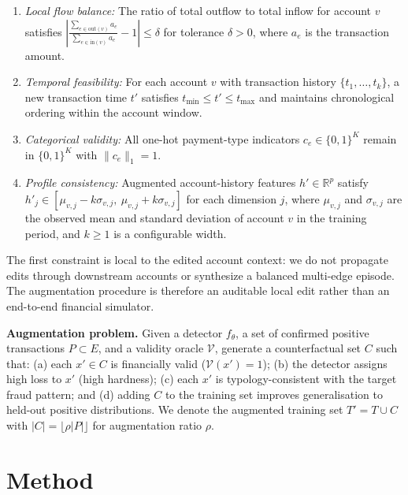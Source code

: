 \documentclass[sigconf,review,anonymous]{acmart}
\begin{document}
\begin{enumerate}
\item \textit{Local flow balance:} The ratio of total outflow to total
      inflow for account $v$ satisfies
      $\left|\frac{\sum_{e \in \text{out}(v)} a_e}{\sum_{e \in \text{in}(v)} a_e} - 1\right| \leq \delta$
      for tolerance $\delta > 0$, where $a_e$ is the transaction amount.
\item \textit{Temporal feasibility:} For each account $v$ with transaction
      history $\{t_1, \ldots, t_k\}$, a new transaction time $t'$ satisfies
      $t_{\min} \leq t' \leq t_{\max}$ and maintains chronological ordering
      within the account window.
\item \textit{Categorical validity:} All one-hot payment-type indicators
      $c_e \in \{0,1\}^K$ remain in $\{0,1\}^K$ with $\|c_e\|_1 = 1$.
\item \textit{Profile consistency:} Augmented account-history features
      $h' \in \mathbb{R}^p$ satisfy
      $h'_j \in [\mu_{v,j} - k\sigma_{v,j},\ \mu_{v,j} + k\sigma_{v,j}]$
      for each dimension $j$, where $\mu_{v,j}$ and $\sigma_{v,j}$ are the
      observed mean and standard deviation of account $v$ in the training
      period, and $k \geq 1$ is a configurable width.
\end{enumerate}

The first constraint is local to the edited account context: we do not
propagate edits through downstream accounts or synthesize a balanced
multi-edge episode. The augmentation procedure is therefore an auditable
local edit rather than an end-to-end financial simulator.

\textbf{Augmentation problem.}
Given a detector $f_\theta$, a set of confirmed positive transactions
$P \subset E$, and a validity oracle $\mathcal{V}$, generate a counterfactual
set $C$ such that: (a) each $x' \in C$ is financially valid
($\mathcal{V}(x') = 1$); (b) the detector assigns high loss to $x'$
(high hardness); (c) each $x'$ is typology-consistent with the target
fraud pattern; and (d) adding $C$ to the training set improves generalisation
to held-out positive distributions. We denote the augmented training set
$T' = T \cup C$ with $|C| = \lfloor \rho |P| \rfloor$ for augmentation
ratio $\rho$.

\section{Method}
\label{sec:method}
\end{document}
